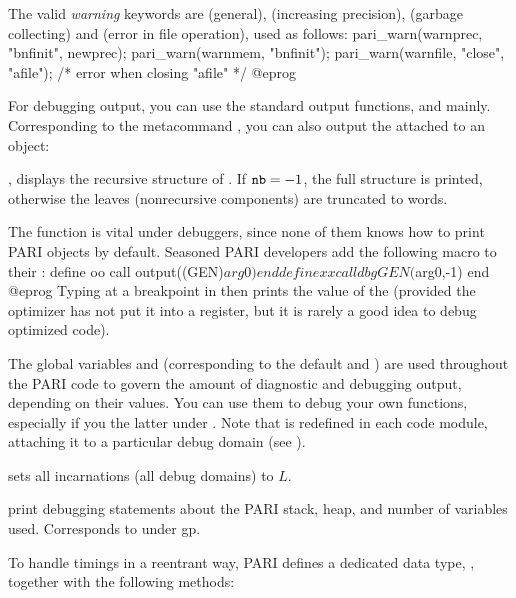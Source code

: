 The valid \emph{warning} keywords are  (general), 
(increasing precision),  (garbage collecting) and 
(error in file operation), used as follows:
\bprog
    pari_warn(warnprec, "bnfinit", newprec);
    pari_warn(warnmem,  "bnfinit");
    pari_warn(warnfile, "close", "afile");  /* error when closing "afile" */
@eprog

\label{se:dbg_output}

For debugging output, you can use the standard output
functions,  and  mainly. Corresponding to the
 metacommand , you can also output the  attached to an object:

, displays the recursive structure of
. If ${\tt nb} = -1$, the full structure is printed, otherwise
the leaves (nonrecursive components) are truncated to  words.

\noindent The function  is vital under debuggers, since none of
them knows how to print PARI objects by default. Seasoned PARI developers
add the following  macro to their :
\bprog
  define oo
    call output((GEN)$arg0)
  end
  define xx
    call dbgGEN($arg0,-1)
  end
@eprog\noindent
Typing  at a breakpoint in  then prints the value of the
  (provided the optimizer has not put it into a register, but
it is rarely a good idea to debug optimized code).

\noindent
The global variables  and  (corresponding
to the default  and )
are used throughout the PARI code to govern the amount of diagnostic and
debugging output, depending on their values. You can use them to debug your
own functions, especially if you  the latter under .
Note that  is redefined in each code module, attaching it to
a particular debug domain (see ).

 sets all  incarnations (all
debug domains) to $L$.

 print debugging statements about the PARI
stack, heap, and number of variables used. Corresponds to 
under gp.


\noindent To handle timings in a reentrant way, PARI defines a dedicated data
type, , together with the following methods:

